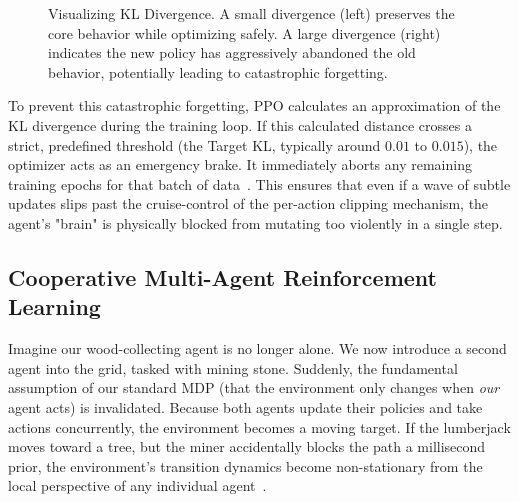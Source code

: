 \begin{figure}[H]
\caption[Visualizing KL Divergence]{Visualizing KL Divergence. A small divergence (left) preserves the core behavior while optimizing safely. A large divergence (right) indicates the new policy has aggressively abandoned the old behavior, potentially leading to catastrophic forgetting.}
\label{fig:kl_divergence}
\end{figure}

To prevent this catastrophic forgetting, PPO calculates an approximation of the KL divergence during the training loop. If this calculated distance crosses a strict, predefined threshold (the Target KL, typically around $0.01$ to $0.015$), the optimizer acts as an emergency brake. It immediately aborts any remaining training epochs for that batch of data~\parencite{Schulman_Wolski_Dhariwal_Radford_Klimov_2017}. This ensures that even if a wave of subtle updates slips past the cruise-control of the per-action clipping mechanism, the agent's "brain" is physically blocked from mutating too violently in a single step.

\subsection{Cooperative Multi-Agent Reinforcement Learning}
\label{sec:marl_foundations}

Imagine our wood-collecting agent is no longer alone. We now introduce a second agent into the grid, tasked with mining stone. Suddenly, the fundamental assumption of our standard MDP (that the environment only changes when \emph{our} agent acts) is invalidated. Because both agents update their policies and take actions concurrently, the environment becomes a moving target. If the lumberjack moves toward a tree, but the miner accidentally blocks the path a millisecond prior, the environment's transition dynamics become non-stationary from the local perspective of any individual agent~\parencite{Albrecht_Christianos_Schäfer_2024}.

